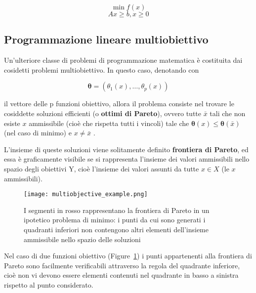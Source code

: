 \begin{equation*}
    \min f(x)
    \label{eq:}
\end{equation*}
\begin{equation*}
    Ax \geq b, x \geq 0
    \label{eq:}
\end{equation*}

\subsection{Programmazione lineare multiobiettivo}
\label{section:lin_programming_mo}

Un'ulteriore classe di problemi di programmazione matematica è costituita dai cosidetti
problemi multiobiettivo. In questo caso, denotando con 

\begin{equation*}
    \mathbf{\theta} = (\theta_1(x), \dots, \theta_p(x))
    \label{eq:}
\end{equation*}

il vettore delle p funzioni obiettivo, allora il problema consiste nel trovare le 
cosiddette soluzioni efficienti (o \textbf{ottimi di Pareto}), ovvero tutte $\bar{x}$ tali 
che non esiste $x$ ammissibile (cioè che rispetta tutti i vincoli) tale che 
$\mathbf{\theta}(x) \leq \mathbf{\theta}(\bar{x})$ (nel caso di minimo) e 
$x \neq \bar{x}$ \cite{walsh1985introduction}.

L'insieme di queste soluzioni viene solitamente definito \textbf{frontiera di Pareto}, 
ed essa è graficamente visibile se si rappresenta l'insieme dei valori ammissibili nello 
spazio degli obiettivi Y, cioè l'insieme dei valori assunti da tutte $x \in X$ 
(le $x$ ammissibili).

\begin{figure}
    \begin{small}
        \begin{center}
            \texttt{[image: multiobjective\_example.png]}
        \end{center}
        \caption{I segmenti in rosso rappresentano la frontiera di Pareto
            in un ipotetico problema di minimo: i punti da cui sono generati i 
            quadranti inferiori non contengono altri elementi dell'insieme 
            ammissibile nello spazio delle soluzioni}
        \label{fig:obj}
    \end{small}
\end{figure}

Nel caso di due funzioni obiettivo (Figure~\ref{fig:obj}) i punti appartenenti 
alla frontiera di Pareto sono facilmente verificabili attraverso la regola del quadrante
inferiore, cioè non vi devono essere elementi contenuti nel quadrante in basso a sinistra 
rispetto al punto considerato.

